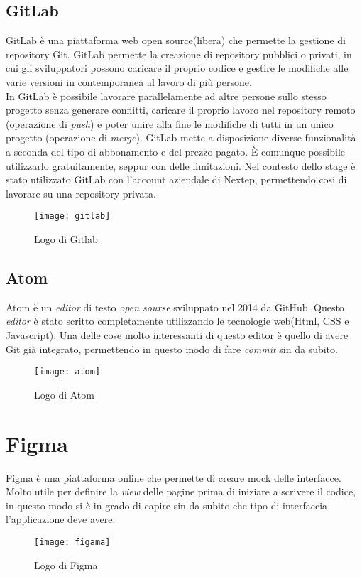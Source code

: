 \subsection{GitLab}GitLab è una piattaforma web open source(libera) che permette la gestione di repository Git. GitLab permette la creazione di repository pubblici o privati, in cui gli sviluppatori possono caricare il proprio codice e gestire le modifiche alle varie versioni in contemporanea al lavoro di più persone. 
\\

In GitLab è possibile lavorare parallelamente ad altre persone sullo stesso progetto senza generare conflitti, caricare il proprio lavoro nel repository remoto (operazione di \emph{push}) e poter unire alla fine le modifiche di tutti in un unico progetto (operazione di \emph{merge}). GitLab mette a disposizione diverse funzionalità a seconda del tipo di abbonamento e del prezzo pagato. È comunque possibile utilizzarlo gratuitamente, seppur con delle limitazioni. Nel contesto dello stage è stato utilizzato GitLab con l'account aziendale di Nextep, permettendo cosi di lavorare su una repository privata. 
\begin{figure}[!h] 
	\centering 
	\texttt{[image: gitlab]}
	\caption{Logo di Gitlab}
\end{figure}
\subsection{Atom}
Atom è un \emph{editor} di testo \emph{open sourse} sviluppato nel 2014 da GitHub. Questo \emph{editor} è stato scritto completamente utilizzando le tecnologie web(Html, CSS e Javascript). 
Una delle cose molto interessanti di questo editor è quello di avere Git già integrato, permettendo in questo modo di fare \emph{commit} sin da subito. 
\begin{figure}[!h] 
	\centering 
	\texttt{[image: atom]}
	\caption{Logo di Atom}
\end{figure}
 \section{Figma} Figma è una piattaforma online che permette di creare \gls{mock} delle interfacce. Molto utile per definire la \emph{view} delle pagine prima di iniziare a scrivere il codice, in questo modo si è in grado di capire sin da subito che tipo di interfaccia l'applicazione deve avere.
 \begin{figure}[!h] 
 	\centering 
 	\texttt{[image: figama]}
 	\caption{Logo di Figma}
 \end{figure}
